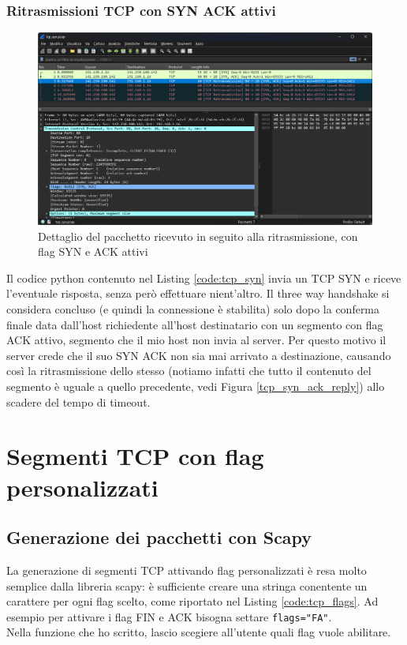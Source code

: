 \documentclass[12pt,a4paper]{report}
\begin{document}
\subsection{Ritrasmissioni TCP con SYN ACK attivi}
\begin{figure}[H]
	\centering
	\includegraphics[width=1\textwidth]{tcp_syn_ack_retransmission}
 	\caption{Dettaglio del pacchetto ricevuto in seguito alla ritrasmissione, con flag SYN e ACK attivi}
	\label{tcp_syn_ack_retransmission}
\end{figure}
Il codice python contenuto nel Listing \ref{code:tcp_syn} invia un TCP SYN e riceve l'eventuale risposta, senza però effettuare nient'altro.
Il three way handshake si considera concluso (e quindi la connessione è stabilita) solo dopo la conferma finale data dall'host richiedente all'host destinatario con un segmento con flag ACK attivo, segmento che il mio host non invia al server.
Per questo motivo il server crede che il suo SYN ACK non sia mai arrivato a destinazione, causando così la ritrasmissione dello stesso (notiamo infatti che tutto il contenuto del segmento è uguale a quello precedente, vedi Figura \ref{tcp_syn_ack_reply}) allo scadere del tempo di timeout.

\chapter{Segmenti TCP con flag personalizzati}

\section{Generazione dei pacchetti con Scapy}
La generazione di segmenti TCP attivando flag personalizzati è resa molto semplice dalla libreria scapy: è sufficiente creare una stringa conentente un carattere per ogni flag scelto, come riportato nel Listing \ref{code:tcp_flags}.
Ad esempio per attivare i flag FIN e ACK bisogna settare \texttt{flags="FA"}. \\
Nella funzione che ho scritto, lascio scegiere all'utente quali flag vuole abilitare.
\end{document}
